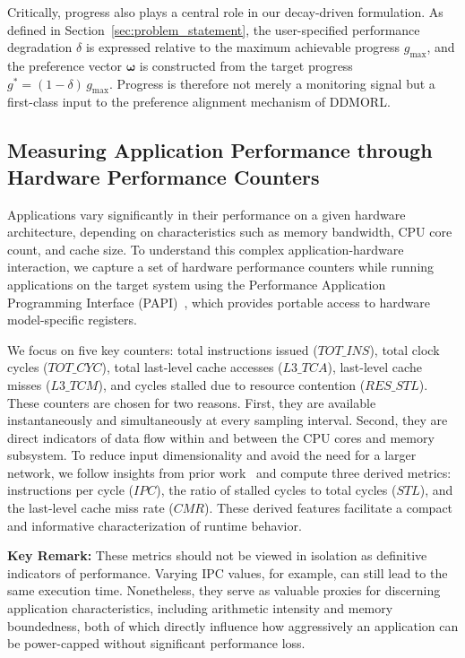 Critically, progress also plays a central role in our 
decay-driven formulation. As defined in 
Section~\ref{sec:problem_statement}, the user-specified 
performance degradation $\delta$ is expressed relative to the 
maximum achievable progress $g_{\max}$, and the preference 
vector $\boldsymbol{\omega}$ is constructed from the 
target progress $g^* = (1-\delta)\,g_{\max}$. Progress is 
therefore not merely a monitoring signal but a first-class 
input to the preference alignment mechanism of DDMORL.

\subsection{Measuring Application Performance through Hardware 
Performance Counters}
\label{ch5:subsec:Applications_vs_perf}

Applications vary significantly in their performance on a given 
hardware architecture, depending on characteristics such as 
memory bandwidth, CPU core count, and cache size. To understand 
this complex application-hardware interaction, we capture a set 
of hardware performance counters while running applications on 
the target system using the Performance Application Programming 
Interface (PAPI)~\cite{mucci1999papi}, which provides portable 
access to hardware model-specific registers.

We focus on five key counters: total instructions issued 
($TOT\_INS$), total clock cycles ($TOT\_CYC$), total last-level 
cache accesses ($L3\_TCA$), last-level cache misses ($L3\_TCM$), 
and cycles stalled due to resource contention ($RES\_STL$). 
These counters are chosen for two reasons. First, they are 
available instantaneously and simultaneously at every sampling 
interval. Second, they are direct indicators of data flow within 
and between the CPU cores and memory subsystem. To reduce input 
dimensionality and avoid the need for a larger network, we 
follow insights from prior 
work~\cite{wittmann2016chip,rane2014enhancing} and compute 
three derived metrics: instructions per cycle ($IPC$), the 
ratio of stalled cycles to total cycles ($STL$), and the 
last-level cache miss rate ($CMR$). These derived features 
facilitate a compact and informative characterization of runtime 
behavior.

\textbf{Key Remark:} These metrics should not be viewed in 
isolation as definitive indicators of performance. Varying IPC 
values, for example, can still lead to the same execution time. 
Nonetheless, they serve as valuable proxies for discerning 
application characteristics, including arithmetic intensity and 
memory boundedness, both of which directly influence how 
aggressively an application can be power-capped without 
significant performance loss.


